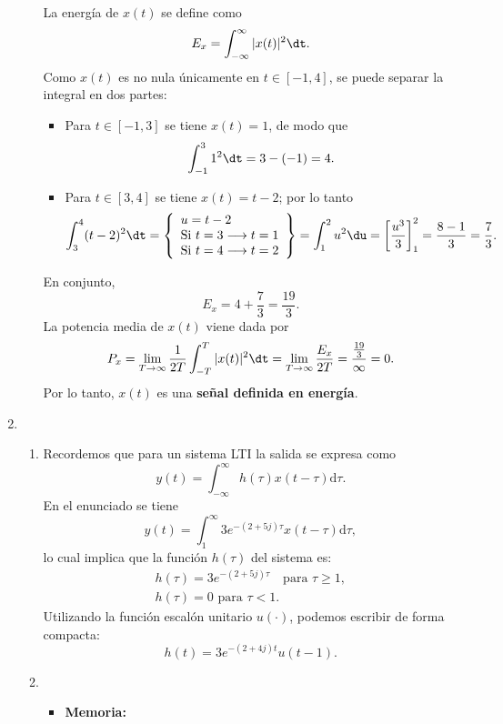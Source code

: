 \begin{enumerate}[label=\color{red}\textbf{\arabic*)}]
\begin{enumerate}[label=\color{red}\textbf{\alph*)}]
        La energía de $x(t)$ se define como  \[
        E_x=\int_{-\infty}^{\infty} |x(t)|^2\dt. 
        \] 
        Como $x(t)$ es no nula únicamente en  $t\in [-1,4]$, se puede separar la integral en dos partes:
        \begin{itemize}[label=\textbullet]
            \item Para $t\in [-1,3]$ se tiene $x(t)=1$, de modo que  \[
                \int_{-1}^{3} 1^2\dt=3-(-1)=4. 
                \] 
            \item Para $t\in [3,4]$ se tiene $x(t)=t-2$; por lo tanto  \[
            \int_{3}^{4} (t-2)^2\dt=\left\{ \begin{array}{l}
                u=t-2\\
                \text{Si }t=3\longrightarrow t=1\\
                \text{Si }t=4\longrightarrow t=2
            \end{array} \right\} =\int_{1}^{2} u^2\du =\left[ \dfrac{u^3}{3} \right] _1^2=\dfrac{8-1}{3}  =\dfrac{7}{3}.
            \] 
        \end{itemize}
        En conjunto, \[
        E_x=4+\dfrac{7}{3}=\dfrac{19}{3}.
        \] 
        La potencia media de $x(t)$ viene dada por  \[
        P_x=\lim_{T \to \infty} \dfrac{1}{2T}\int_{-T}^{T} |x(t)|^2\dt=\lim_{T \to \infty} \dfrac{E_x}{2T}=\dfrac{\frac{19}{3} }{\infty}=0.  
        \] 
        Por lo tanto, $x(t)$ es una \textbf{señal definida en energía}.
\end{enumerate}
\item {} 
\begin{enumerate}[label=\color{red}\textbf{\alph*)}]
    \item {}

        Recordemos que para un sistema LTI la salida se expresa como \[
        y(t)=\int_{-\infty}^{\infty} h(\tau)x(t-\tau)\mathrm{d}\tau. 
        \] 
        En el enunciado se tiene \[
        y(t)=\int_{1}^{\infty} 3e^{-(2+5j)\tau}x(t-\tau)\mathrm{d}\tau,  
        \] lo cual implica que la función $h(\tau)$ del sistema es:  \[
        \begin{array}{c}
            h(\tau)=3e^{-(2+5j)\tau}\quad \text{para }\tau\ge 1,\\
            h(\tau)=0\text{ para }\tau<1.
        \end{array}
        \] 
        Utilizando la función escalón unitario $u(\cdot )$, podemos escribir de forma compacta: \[
            \boxed{h(t)=3e^{-(2+4j)t}u(t-1). }
        \] 
    \item {}
        \begin{itemize}[label=\textbullet]
            \item \textbf{Memoria:}


\end{itemize}
\end{enumerate}
\end{enumerate}
